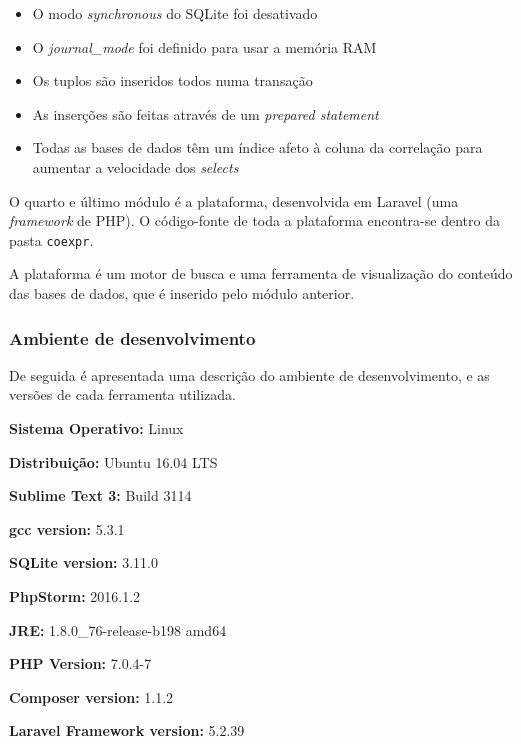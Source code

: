 \begin{itemize}
    \item O modo \textit{synchronous} do SQLite foi desativado
    
    \item O \textit{journal\_mode} foi definido para usar a memória RAM
    
    \item Os tuplos são inseridos todos numa transação
    
    \item As inserções são feitas através de um \textit{prepared statement}
    
    \item Todas as bases de dados têm um índice afeto à coluna da correlação para aumentar a velocidade dos \textit{selects}
\end{itemize}

\bigskip

O quarto e último módulo é a plataforma, desenvolvida em Laravel (uma \textit{framework} de PHP). O código-fonte de toda a plataforma encontra-se dentro da pasta \texttt{coexpr}.

A plataforma é um motor de busca e uma ferramenta de visualização do conteúdo das bases de dados, que é inserido pelo módulo anterior.

\subsubsection{Ambiente de desenvolvimento}

De seguida é apresentada uma descrição do ambiente de desenvolvimento, e as versões de cada ferramenta utilizada.

\medskip

\textbf{Sistema Operativo:} Linux

\textbf{Distribuição:} Ubuntu 16.04 LTS

\medskip

\textbf{Sublime Text 3:} Build 3114

\textbf{gcc version:} 5.3.1

\textbf{SQLite version:} 3.11.0

\medskip

\textbf{PhpStorm:} 2016.1.2

\textbf{JRE:} 1.8.0\_76-release-b198 amd64

\textbf{PHP Version:} 7.0.4-7

\textbf{Composer version:} 1.1.2

\textbf{Laravel Framework version:} 5.2.39

\newpage
